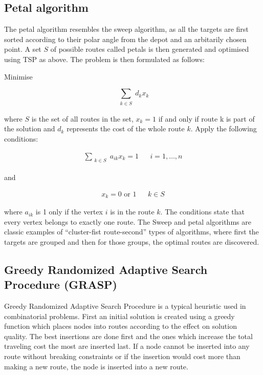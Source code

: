\subsection{Petal algorithm}

The petal algorithm resembles the sweep algorithm, as all the targets are first sorted according to their polar angle from the depot and an arbitarily chosen point. A set $S$ of possible routes called petals is then generated and optimised using TSP as above. The problem is then formulated as follows:

\bigskip
\noindent
Minimise

\begin{equation}
\label{eq:petal1}
\displaystyle\sum_{\substack{k \in S}} d_kx_k
\end{equation}


\noindent
where $S$ is the set of all routes in the set, $x_k = 1$ if and only if route k is part of the solution and $d_k$ represents the cost of the whole route $k$. Apply the following conditions:

\begin{equation}
\begin{aligned}
\label{eq:petal2}
\displaystyle\sum_{\substack{k \in S}} a_{ik}x_k = 1 && i = 1, \ldots, n
\end{aligned}
\end{equation}

\noindent
and

\begin{equation}
\begin{aligned}
\label{eq:petal3}
x_{k} = 0 \text{ or } 1 && k \in S
\end{aligned}
\end{equation}

where $a_{ik}$ is 1 only if the vertex $i$ is in the route $k$. \cite{laporte2000classical} The conditions state that every vertex belongs to exactly one route. The Sweep and petal algorithms are classic examples of ``cluster-fist route-second'' types of algorithms, where first the targets are grouped and then for those groups, the optimal routes are discovered. 


\subsection{Greedy Randomized Adaptive Search Procedure (GRASP)}

Greedy Randomized Adaptive Search Procedure is a typical heuristic used in combinatorial problems. First an initial solution is created using a greedy function which places nodes into routes according to the effect on solution quality. The best insertions are done first and the ones which increase the total traveling cost the most are inserted last. If a node cannot be inserted into any route without breaking constraints or if the insertion would cost more than making a new route, the node is inserted into a new route. \cite{kontoravdis1995grasp}


